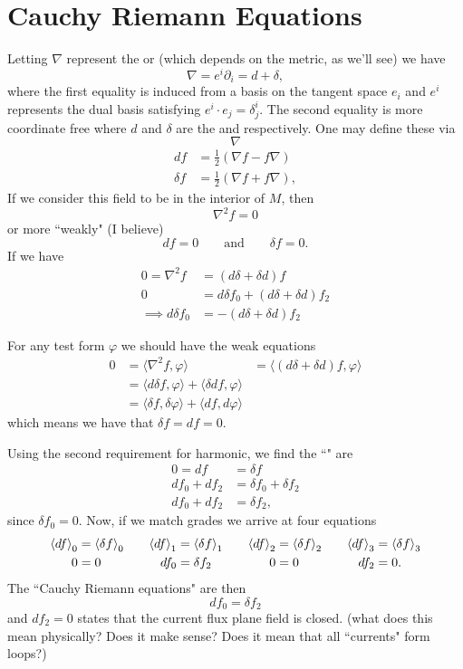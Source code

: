 \section*{Cauchy Riemann Equations}

Letting $\nabla$ represent the  or  (which depends on the metric, as we'll see) we have
\[
\nabla = e^i \partial_i = d + \delta,
\]
where the first equality is induced from a basis on the tangent space $e_i$ and $e^i$ represents the dual basis satisfying $e^i \cdot e_j = \delta^i_j$. The second equality is more coordinate free where $d$ and $\delta$ are the  and  respectively. One may define these via
\[
\nabla
\]
\begin{align*}
df &= \frac{1}{2}\left( \nabla f - f\nabla\right)\\
\delta f &= \frac{1}{2} \left( \nabla f + f\nabla\right),
\end{align*}
If we consider this field to be  in the interior of $M$, then
\[
\nabla^2 f =0 
\]
or more ``weakly" (I believe)
\[
d f =0 \qquad \textrm{and} \qquad \delta f = 0.
\]
If we have 
\begin{align*}
    0=\nabla^2 f &= (d\delta +\delta d) f\\
    0&= d\delta f_0 + (d\delta + \delta d)f_2\\
    \implies d\delta f_0 &= -(d\delta + \delta d)f_2
\end{align*}

For any test form $\varphi$ we should have the weak equations
\begin{align*}
    0&=\langle \nabla^2 f, \varphi\rangle &= \langle (d\delta + \delta d)f,\varphi \rangle\\
    &= \langle d \delta f, \varphi\rangle + \langle \delta d f, \varphi \rangle \\
    &= \langle \delta f, \delta \varphi \rangle + \langle df,d\varphi\rangle
\end{align*}
which means we have that $\delta f=df=0$.

Using the second requirement for harmonic, we find the ``" are
\begin{align*}
    0=df&=\delta f\\
    df_0 + df_2 &= \delta f_0 + \delta f_2\\
    df_0 + df_2 &= \delta f_2,
\end{align*}
since $\delta f_0=0$.  Now, if we match grades we arrive at four equations
\begin{align*}
    \left\langle df\right\rangle_0&=\left\langle\delta f\right\rangle_0 &&& \left\langle df\right\rangle_1&=\left\langle\delta f\right\rangle_1 &&& \left\langle df\right\rangle_2&= \left\langle\delta f\right\rangle_2 &&& \left\langle df\right\rangle_3&= \left\langle\delta f\right\rangle_3\\
    0 &= 0 &&& df_0 &= \delta f_2 &&& 0&=0 &&& df_2 &= 0.
\end{align*}
The ``Cauchy Riemann equations" are then
\[
df_0= \delta f_2
\]
and $df_2 =0$ states that the current flux plane field is closed. (what does this mean physically? Does it make sense? Does it mean that all ``currents" form loops?) 


